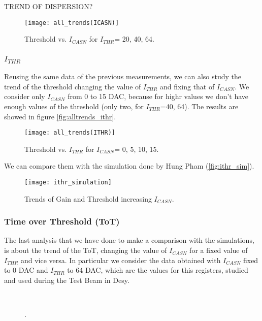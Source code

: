 TREND OF DISPERSION?

\begin{figure}[h!]
\centering
\texttt{[image: all\_trends(ICASN)]}
\caption{Threshold vs. $I_{CASN}$ for $I_{THR}$= 20, 40, 64.}
\label{fig:alltrends_icasn}
\end{figure}

\subsubsection{$I_{THR}$}

Reusing the same data of the previous measurements, we can also study the trend of the threshold changing the value of $I_{THR}$ and fixing that of $I_{CASN}$. We consider only $I_{CASN}$ from 0 to 15 DAC, because for highr values we don't have enough values of the threshold (only two, for $I_{THR}$=40, 64). The results are showed in figure \vref{fig:alltrends_ithr}.

\begin{figure}[h!]
\centering
\texttt{[image: all\_trends(ITHR)]}
\caption{Threshold vs. $I_{THR}$ for $I_{CASN}$= 0, 5, 10, 15.}
\label{fig:alltrends_ithr}
\end{figure}

We can compare them with the simulation done by Hung Pham (\vref{fig:ithr_sim}). 

\begin{figure}[h!]
\centering
\texttt{[image: ithr\_simulation]}
\caption{Trends of Gain and Threshold increasing $I_{CASN}$.}
\label{fig:ithr_sim}
\end{figure}

\subsubsection{Time over Threshold (ToT)}

The last analysis that we have done to make a comparison with the simulations, is about the trend of the ToT, changing the value of $I_{CASN}$ for a fixed value of $I_{THR}$ and vice versa. In particular we consider the data obtained with $I_{CASN}$ fixed to 0 DAC and $I_{THR}$ to 64 DAC, which are the values for this registers, studied and used during the Test Beam in Desy.

\begin{figure}[h!]
\centering
{}\quad
{}\\
\caption{.}
\label{fig:tot_vs_ithr}
\end{figure}

